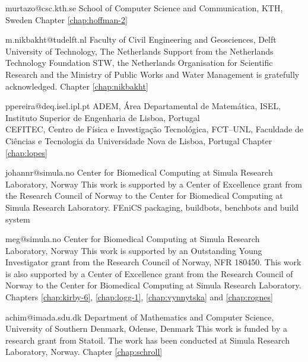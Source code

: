              {murtazo@csc.kth.se}
             {School of Computer Science and Communication, KTH, Sweden}
             {}
             {Chapter \ref{chap:hoffman-2}}

             {m.nikbakht@tudelft.nl}
             {Faculty of Civil Engineering and Geosciences,
             Delft University of Technology, The Netherlands}
             {Support from the Netherlands Technology Foundation STW,
              the Netherlands Organisation for Scientific Research
              and the Ministry of Public Works and Water Management is
              gratefully acknowledged.}
             {Chapter \ref{chap:nikbakht}}

             {ppereira@deq.isel.ipl.pt}
             {ADEM, \'{A}rea Departamental de Matem\'{a}tica,
              ISEL, Instituto Superior de Engenharia de Lisboa, Portugal \\
              CEFITEC, Centro de F\'{i}sica e Investiga\c{c}\~ao Tecnol\'{o}gica, FCT--UNL,
              Faculdade de Ci\^{e}ncias e Tecnologia da Universidade Nova de Lisboa, Portugal}
             {}
             {Chapter \ref{chap:lopes}}

             {johannr@simula.no}
             {Center for Biomedical Computing at Simula Research Laboratory, Norway}
             {This work is supported by a Center of Excellence grant
              from the Research Council of Norway to the Center for
              Biomedical Computing at Simula Research Laboratory.}
             {FEniCS packaging, buildbots, benchbots and build system}

             {meg@simula.no}
             {Center for Biomedical Computing at Simula Research Laboratory, Norway}
             {This work is supported by an Outstanding Young
              Investigator grant from the Research Council of Norway,
              NFR 180450. This work is also supported by a Center of
              Excellence grant from the Research Council of Norway to
              the Center for Biomedical Computing at Simula Research
              Laboratory.}
             {Chapters
              \ref{chap:kirby-6},
              \ref{chap:logg-1},
              \ref{chap:vynnytska} and
              \ref{chap:rognes}}

             {achim@imada.sdu.dk}
             {Department of Mathematics and Computer Science, University of Southern Denmark, Odense, Denmark}
             {This work is funded by a research grant from Statoil.
              The work has been conducted at Simula Research Laboratory, Norway.}
             {Chapter \ref{chap:schroll}}

